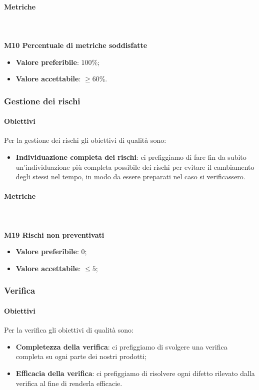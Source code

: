 			\paragraph{Metriche} \mbox{} \\ \\
				\textbf{M10 Percentuale di metriche soddisfatte}
				\begin{itemize}
					\item \textbf{Valore preferibile}: $100\%$;
					\item \textbf{Valore accettabile}: $\ge 60\%$.
				\end{itemize}
        
		\subsubsection{Gestione dei rischi} 
			\paragraph{Obiettivi}
			Per la gestione dei rischi gli obiettivi di qualità sono:
			\begin{itemize}
				\item \textbf{Individuazione completa dei rischi}: ci prefiggiamo di fare fin da subito un'individuazione più completa possibile dei rischi per evitare il cambiamento degli stessi nel tempo, in modo da essere preparati nel caso si verificassero.
			\end{itemize}
			\paragraph{Metriche} \mbox{} \\ \\
			\textbf{M19 Rischi non preventivati} 
			\begin{itemize}
				\item \textbf{Valore preferibile}: 0;
				\item \textbf{Valore accettabile}: $ \le 5$;
			\end{itemize}

		\subsubsection{Verifica}
		\paragraph{Obiettivi}
		Per la verifica gli obiettivi di qualità sono:
		\begin{itemize}
			\item \textbf{Completezza della verifica}: ci prefiggiamo di svolgere una verifica completa su ogni parte dei nostri prodotti;
			\item \textbf{Efficacia della verifica}: ci prefiggiamo di risolvere ogni difetto rilevato dalla verifica al fine di renderla efficacie.
		\end{itemize}
